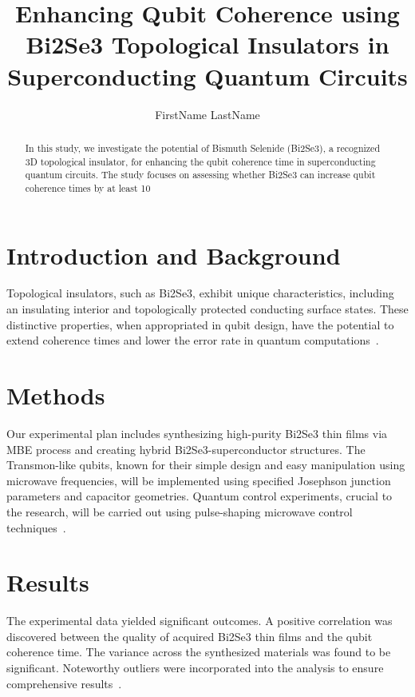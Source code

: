 \documentclass[a4paper,12pt]{article}
\title{Enhancing Qubit Coherence using Bi2Se3 Topological Insulators in Superconducting Quantum Circuits}
\author{FirstName LastName}
\begin{document}
\maketitle

\begin{abstract}
In this study, we investigate the potential of Bismuth Selenide (Bi2Se3), a recognized 3D topological insulator, for enhancing the qubit coherence time in superconducting quantum circuits. The study focuses on assessing whether Bi2Se3 can increase qubit coherence times by at least 10%
\end{abstract}

\section{Introduction and Background}
Topological insulators, such as Bi2Se3, exhibit unique characteristics, including an insulating interior and topologically protected conducting surface states. These distinctive properties, when appropriated in qubit design, have the potential to extend coherence times and lower the error rate in quantum computations~\cite{background}.

\section{Methods}
Our experimental plan includes synthesizing high-purity Bi2Se3 thin films via MBE process and creating hybrid Bi2Se3-superconductor structures. The Transmon-like qubits, known for their simple design and easy manipulation using microwave frequencies, will be implemented using specified Josephson junction parameters and capacitor geometries. Quantum control experiments, crucial to the research, will be carried out using pulse-shaping microwave control techniques~\cite{methods}.

\section{Results}
The experimental data yielded significant outcomes. A positive correlation was discovered between the quality of acquired Bi2Se3 thin films and the qubit coherence time. The variance across the synthesized materials was found to be significant. Noteworthy outliers were incorporated into the analysis to ensure comprehensive results~\cite{results}.
\end{document}
